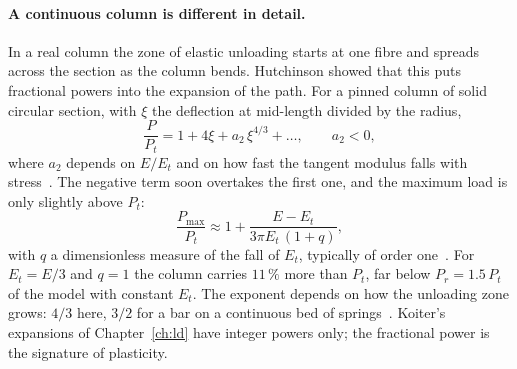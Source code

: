 \paragraph{A continuous column is different in detail.}
In a real column the zone of elastic unloading starts at one fibre and spreads across the section
as the column bends. Hutchinson showed that this puts fractional powers into the expansion of the
path. For a pinned column of solid circular section, with $\xi$ the deflection at mid-length divided by
the radius,
\begin{equation}\label{eq:tw-hutchinson}
  \frac{P}{P_t} = 1 + 4\xi + a_2\,\xi^{4/3} + \dots,
  \qquad a_2 < 0,
\end{equation}
where $a_2$ depends on $E/E_t$ and on how fast the tangent modulus falls with
stress~\cite[Eqs.~(4.58)--(4.59)]{tw-hutchinson1974}. The negative term soon overtakes the first one,
and the maximum load is only slightly above $P_t$:
\begin{equation}\label{eq:tw-hutchinson-max}
  \frac{P_{\max}}{P_t} \approx 1 + \frac{E - E_t}{3\pi E_t\,(1 + q)} ,
\end{equation}
with $q$ a dimensionless measure of the fall of $E_t$, typically of order one~\cite[Eq.~(4.61)]{tw-hutchinson1974}.
For $E_t = E/3$ and $q = 1$ the column carries $11\,\%$ more than $P_t$, far below
$P_r = 1.5\,P_t$ of the model with constant $E_t$. The exponent depends on how the unloading zone
grows: $4/3$ here, $3/2$ for a bar on a continuous bed of springs~\cite[Eq.~(2.47)]{tw-hutchinson1974}.
Koiter's expansions of Chapter~\ref{ch:ld} have integer powers only; the fractional power is the
signature of plasticity.

